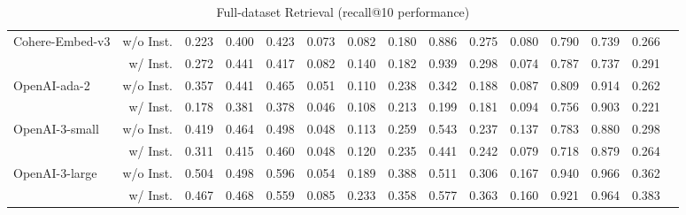 \begin{table}[h]
{\begin{tabular}{lr|rcccccccccc|cc}
\multirow{2}{*}{Cohere-Embed-v3} &w/o Inst. &0.223 &0.400 &0.423 &0.073 &0.082 &0.180 &0.886 &0.275 &0.080 &0.790 &0.739 &0.266 \\
&w/ Inst. &0.272 &0.441 &0.417 &0.082 &0.140 &0.182 &0.939 &0.298 &0.074 &0.787 &0.737 &0.291 \\
\multirow{2}{*}{OpenAI-ada-2} &w/o Inst. &0.357 &0.441 &0.465 &0.051 &0.110 &0.238 &0.342 &0.188 &0.087 &0.809 &0.914 &0.262 \\
&w/ Inst. &0.178 &0.381 &0.378 &0.046 &0.108 &0.213 &0.199 &0.181 &0.094 &0.756 &0.903 &0.221 \\
\multirow{2}{*}{OpenAI-3-small} &w/o Inst. &0.419 &0.464 &0.498 &0.048 &0.113 &0.259 &0.543 &0.237 &0.137 &0.783 &0.880 &0.298 \\
&w/ Inst. &0.311 &0.415 &0.460 &0.048 &0.120 &0.235 &0.441 &0.242 &0.079 &0.718 &0.879 &0.264 \\
\multirow{2}{*}{OpenAI-3-large} &w/o Inst. &0.504 &0.498 &0.596 &0.054 &0.189 &0.388 &0.511 &0.306 &0.167 &0.940 &0.966 &0.362 \\
&w/ Inst. &0.467 &0.468 &0.559 &0.085 &0.233 &0.358 &0.577 &0.363 &0.160 &0.921 &0.964 &0.383 \\
\bottomrule
\end{tabular}}
\caption{Full-dataset Retrieval (recall@10 performance)}\label{tab: full-dataset recall@10}
\end{table}